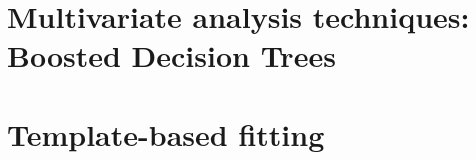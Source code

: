 \section{Multivariate analysis techniques: Boosted Decision Trees}
\section{Template-based fitting}


